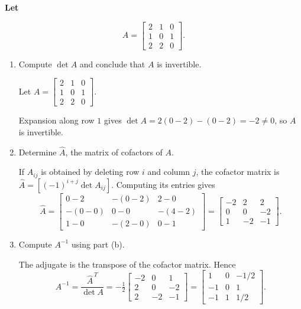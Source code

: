 \providecommand{\rank}{\operatorname{r}}
\providecommand{\RR}{\mathbb R}
\providecommand{\CC}{\mathbb C}
\providecommand{\KK}{\mathbb K}

\setcounter{enumi}{54}
\item {\bfseries\boldmath
Let
}

\[
A=\begin{bmatrix}2&1&0\\1&0&1\\2&2&0\end{bmatrix}.
\]

\begin{enumerate}[label=\alph*)]

\item Compute $\det A$ and conclude that $A$ is invertible.

\begin{answer}
Let $A=\begin{bmatrix}2&1&0\\1&0&1\\2&2&0\end{bmatrix}$.

Expansion along row $1$ gives
$\det A=2(0-2)-(0-2)=-2\ne0$, so $A$ is invertible.
\end{answer}

\item Determine $\widehat A$, the matrix of cofactors of $A$.

\begin{answer}
If $A_{ij}$ is obtained by deleting row $i$ and column $j$, the cofactor
matrix is $\widehat A=[(-1)^{i+j}\det A_{ij}]$. Computing its entries gives
\[
 \widehat A=
 \begin{bmatrix}
 0-2&-(0-2)&2-0\\-(0-0)&0-0&-(4-2)\\1-0&-(2-0)&0-1
 \end{bmatrix}
 =\begin{bmatrix}-2&2&2\\0&0&-2\\1&-2&-1\end{bmatrix}.
\]
\end{answer}

\item Compute $A^{-1}$ using part (b).

\begin{answer}
The adjugate is the transpose of the cofactor matrix. Hence
\[
 A^{-1}=\frac{\widehat A^{\,T}}{\det A}
 =-\tfrac12\begin{bmatrix}-2&0&1\\2&0&-2\\2&-2&-1\end{bmatrix}
 =\begin{bmatrix}1&0&-1/2\\-1&0&1\\-1&1&1/2\end{bmatrix}.
\]
\end{answer}
\end{enumerate}
